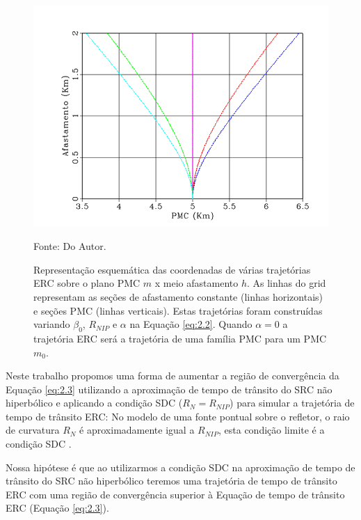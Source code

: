 \begin{figure}[htb]
\caption{Representação esquemática das coordenadas de várias trajetórias ERC sobre o plano PMC $m$ x meio afastamento
$h$. As linhas do grid representam as seções de afastamento constante (linhas horizontais) e seções PMC (linhas verticais).
Estas trajetórias foram construídas variando $\beta_0$, $R_{NIP}$ e $\alpha$  na Equação \ref{eq:2.2}. Quando
$\alpha=0$ a trajetória ERC será a trajetória de uma família PMC para um PMC $m_0$.}
\begin{center}
\includegraphics[scale=0.5]{images/creCoord.png}
\vspace{-0.3cm}
\end{center}
\begin{center}
 Fonte: Do Autor.
\end{center}
\label{fig:2.2}
\end{figure}

Neste trabalho propomos uma forma de aumentar a região de convergência da Equação \ref{eq:2.3} utilizando a
aproximação de tempo de trânsito do SRC não hiperbólico e aplicando a condição SDC ($R_N=R_{NIP}$) para
simular a trajetória de tempo de trânsito ERC: No modelo de uma fonte pontual sobre o refletor, o raio de 
curvatura $R_N$ é aproximadamente igual a $R_{NIP}$, esta condição limite é a condição SDC \cite{shav}.

Nossa hipótese é que ao utilizarmos a condição SDC na aproximação de tempo de trânsito do SRC não hiperbólico
teremos uma trajetória de tempo de trânsito ERC com uma região de convergência superior à Equação de tempo de
trânsito ERC (Equação \ref{eq:2.3}).

